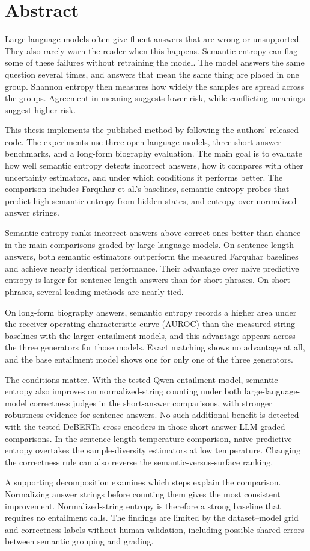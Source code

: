 \chapter*{Abstract}

Large language models often give fluent answers that are wrong or unsupported.
They also rarely warn the reader when this happens. Semantic entropy can flag
some of these failures without retraining the model. The model answers the same
question several times, and answers that mean the same thing are placed in one
group.
Shannon entropy then measures how widely the samples are spread across the
groups. Agreement in meaning suggests lower risk, while conflicting meanings
suggest higher risk.

This thesis implements the published method
by following the authors' released code. The experiments use three open
language models, three short-answer benchmarks, and a long-form biography
evaluation. The main goal is to
evaluate how well semantic entropy detects incorrect answers, how it compares
with other uncertainty estimators, and under which conditions it performs
better. The comparison includes Farquhar et al.'s baselines, semantic entropy
probes that predict high semantic entropy from hidden states, and entropy over normalized
answer strings.

Semantic entropy ranks incorrect answers above correct ones better than
chance in the main comparisons graded by large language models. On sentence-length answers, both
semantic estimators outperform the measured Farquhar baselines and achieve
nearly identical performance. Their advantage over naive predictive entropy
is larger for sentence-length answers than for short phrases. On short
phrases, several leading methods are nearly tied.

On long-form biography answers, semantic entropy records a higher area under
the receiver operating characteristic curve (AUROC) than the measured string
baselines with the larger entailment models, and this advantage appears across
the three generators for those models. Exact matching shows no advantage at all, and the base
entailment model shows one for only one of the three generators.

The conditions matter. With the tested Qwen entailment model, semantic entropy
also improves on normalized\nobreakdash-string counting under both large-language-model
correctness judges in the short-answer comparisons, with stronger robustness
evidence for sentence answers. No such additional benefit is detected with the
tested DeBERTa cross-encoders in those short-answer LLM-graded comparisons.
In the sentence-length temperature comparison, naive predictive entropy
overtakes the sample-diversity estimators at low temperature. Changing the correctness rule can also reverse
the semantic-versus-surface ranking.

A supporting decomposition examines which steps explain the comparison.
Normalizing answer strings before counting them gives the most consistent
improvement. Normalized-string entropy is therefore a strong baseline that
requires no entailment calls. The findings are limited by the dataset--model
grid and correctness labels without human validation, including possible
shared errors between semantic grouping and grading.

